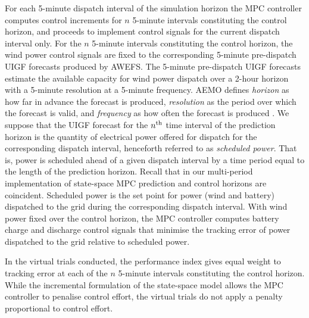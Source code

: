 \documentclass[a4paper, 10pt, twocolumn, preprint, 3p]{elsarticle}
\begin{document}
For each 5-minute dispatch interval of the simulation horizon the MPC controller computes control increments for $n$ 5-minute intervals constituting the control horizon, and proceeds to implement control signals for the current dispatch interval only.  For the $n$ 5-minute intervals constituting the control horizon, the wind power control signals are fixed to the corresponding 5-minute pre-dispatch UIGF forecasts produced by AWEFS.  The 5-minute pre-dispatch UIGF forecasts estimate the available capacity for wind power dispatch over a 2-hour horizon with a 5-minute resolution at a 5-minute frequency.  AEMO defines \textit{horizon} as how far in advance the forecast is produced, \textit{resolution} as the period over which the forecast is valid, and \textit{frequency} as how often the forecast is produced \cite{AEMO16b}.  We suppose that the UIGF forecast for the $n\textsuperscript{th}$ time interval of the prediction horizon is the quantity of electrical power offered for dispatch for the corresponding dispatch interval, henceforth referred to as \textit{scheduled power}.  That is, power is scheduled ahead of a given dispatch interval by a time period equal to the length of the prediction horizon.  Recall that in our multi-period implementation of state-space MPC prediction and control horizons are coincident.  Scheduled power is the set point for power (wind and battery) dispatched to the grid during the corresponding dispatch interval.  With wind power fixed over the control horizon, the MPC controller computes battery charge and discharge control signals that minimise the tracking error of power dispatched to the grid relative to scheduled power.

In the virtual trials conducted, the performance index gives equal weight to tracking error at each of the $n$ 5-minute intervals constituting the control horizon.  While the incremental formulation of the state-space model allows the MPC controller to penalise control effort, the virtual trials do not apply a penalty proportional to control effort.

\end{document}
